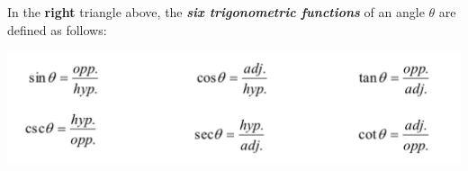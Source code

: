 In the \textbf{right} triangle above, the \textbf{\emph{six trigonometric functions}} of an angle $\theta$ are defined as follows:

\begin{center}
\includegraphics[scale=.6]{trigdef}\\
\end{center}

\newpage






